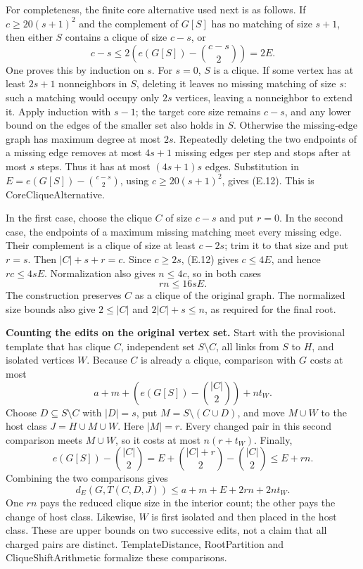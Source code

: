 \documentclass[english,11pt,a4paper]{article}
\begin{document}
For completeness, the finite core alternative used next is as follows. If \(c\ge20(s+1)^2\) and the complement of \(G[S]\) has no matching of size \(s+1\), then either \(S\) contains a clique of size \(c-s\), or \[
c-s\le2\left(e(G[S])-\binom{c-s}{2}\right)=2E.
\tag{E.12}
\] One proves this by induction on \(s\). For \(s=0\), \(S\) is a clique. If some vertex has at least \(2s+1\) nonneighbors in \(S\), deleting it leaves no missing matching of size \(s\): such a matching would occupy only \(2s\) vertices, leaving a nonneighbor to extend it. Apply induction with \(s-1\); the target core size remains \(c-s\), and any lower bound on the edges of the smaller set also holds in \(S\). Otherwise the missing-edge graph has maximum degree at most \(2s\). Repeatedly deleting the two endpoints of a missing edge removes at most \(4s+1\) missing edges per step and stops after at most \(s\) steps. Thus it has at most \((4s+1)s\) edges. Substitution in \(E=e(G[S])-\binom{c-s}{2}\), using \(c\ge20(s+1)^2\), gives (E.12). This is {\ttfamily\small CoreCliqueAl\discretionary{\hbox{\ensuremath{\hookrightarrow}}}{}{}ternative}.

In the first case, choose the clique \(C\) of size \(c-s\) and put \(r=0\). In the second case, the endpoints of a maximum missing matching meet every missing edge. Their complement is a clique of size at least \(c-2s\); trim it to that size and put \(r=s\). Then \(|C|+s+r=c\). Since \(c\ge2s\), (E.12) gives \(c\le4E\), and hence \(rc\le4sE\). Normalization also gives \(n\le4c\), so in both cases \[
rn\le16sE.
\tag{E.13}
\] The construction preserves \(C\) as a clique of the original graph. The normalized size bounds also give \(2\le|C|\) and \(2|C|+s\le n\), as required for the final root.

\textbf{Counting the edits on the original vertex set.} Start with the provisional template that has clique \(C\), independent set \(S\setminus C\), all links from \(S\) to \(H\), and isolated vertices \(W\). Because \(C\) is already a clique, comparison with \(G\) costs at most \[
a+m+\left(e(G[S])-\binom{|C|}{2}\right)+nt_W.
\] Choose \(D\subseteq S\setminus C\) with \(|D|=s\), put \(M=S\setminus(C\cup D)\), and move \(M\cup W\) to the host class \(J=H\cup M\cup W\). Here \(|M|=r\). Every changed pair in this second comparison meets \(M\cup W\), so it costs at most \(n(r+t_W)\). Finally, \[
e(G[S])-\binom{|C|}{2}
=E+\binom{|C|+r}{2}-\binom{|C|}{2}
\le E+rn.
\] Combining the two comparisons gives \[
d_E(G,T(C,D,J))\le a+m+E+2rn+2nt_W.
\tag{E.14}
\] One \(rn\) pays the reduced clique size in the interior count; the other pays the change of host class. Likewise, \(W\) is first isolated and then placed in the host class. These are upper bounds on two successive edits, not a claim that all charged pairs are distinct. {\ttfamily\small TemplateDist\discretionary{\hbox{\ensuremath{\hookrightarrow}}}{}{}ance}, {\ttfamily\small RootPartitio\discretionary{\hbox{\ensuremath{\hookrightarrow}}}{}{}n} and {\ttfamily\small CliqueShiftA\discretionary{\hbox{\ensuremath{\hookrightarrow}}}{}{}rithmetic} formalize these comparisons.
\end{document}
